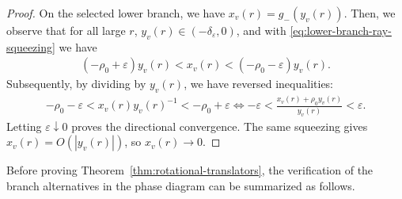 \documentclass{amsart}
\theoremstyle{plain}
\theoremstyle{mainintrothm}
\theoremstyle{definition}
\begin{document}
\begin{proof}
	\medskip
	
	On the selected lower branch, we have $x_v(r)=g_-(y_v(r))$. Then,  we observe that for all large $r$,
	$y_v(r)\in(-\delta_\varepsilon,0)$, and with
	\eqref{eq:lower-branch-ray-squeezing} we have 
	\begin{align*}
		(-\rho_0+\varepsilon)y_v(r)
		<
		x_v(r)
		<
		(-\rho_0-\varepsilon)y_v(r).
	\end{align*}
	Subsequently, by dividing by $y_v(r)$, we have reversed inequalities:
	\begin{align*}
		-\rho_0-\varepsilon<x_v(r)y_v(r)^{-1}<-\rho_0+\varepsilon\Leftrightarrow-\varepsilon<\frac{x_v(r)+\rho_0y_v(r)}{y_v(r)}<\varepsilon.
	\end{align*}
	Letting $\varepsilon\downarrow0$ proves the directional convergence.  The
	same squeezing gives $x_v(r)=O(|y_v(r)|)$, so $x_v(r)\to0$.
\end{proof}


Before proving Theorem~\ref{thm:rotational-translators}, the verification of
the branch alternatives in the phase diagram can be summarized as follows.
\end{document}
